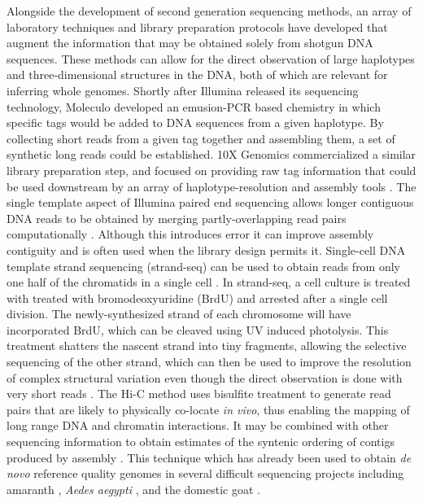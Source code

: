 Alongside the development of second generation sequencing methods, an array of laboratory techniques and library preparation protocols have developed that augment the information that may be obtained solely from shotgun DNA sequences.
These methods can allow for the direct observation of large haplotypes and three-dimensional structures in the DNA, both of which are relevant for inferring whole genomes.
Shortly after Illumina released its sequencing technology, Moleculo developed an emusion-PCR based chemistry in which specific tags would be added to DNA sequences from a given haplotype.
By collecting short reads from a given tag together and assembling them, a set of synthetic long reads could be established.
10X Genomics commercialized a similar library preparation step, and focused on providing raw tag information that could be used downstream by an array of haplotype-resolution and assembly tools \cite{mostovoy2016hybrid}.
The single template aspect of Illumina paired end sequencing allows longer contiguous DNA reads to be obtained by merging partly-overlapping read pairs computationally \cite{magovc2011flash}.
Although this introduces error it can improve assembly contiguity and is often used when the library design permits it.
Single-cell DNA template strand sequencing (strand-seq) can be used to obtain reads from only one half of the chromatids in a single cell \cite{falconer2012dna}.
In strand-seq, a cell culture is treated with treated with bromodeoxyuridine (BrdU) and arrested after a single cell division.
The newly-synthesized strand of each chromosome will have incorporated BrdU, which can be cleaved using UV induced photolysis.
This treatment shatters the nascent strand into tiny fragments, allowing the selective sequencing of the other strand, which can then be used to improve the resolution of complex structural variation even though the direct observation is done with very short reads \cite{porubsky2016direct}.
The Hi-C method \cite{lieberman2009comprehensive} uses bisulfite treatment to generate read pairs that are likely to physically co-locate \emph{in vivo}, thus enabling the mapping of long range DNA and chromatin interactions.
It may be combined with other sequencing information to obtain estimates of the syntenic ordering of contigs produced by assembly \cite{ghurye2018integrating}.
This technique which has already been used to obtain \emph{de novo} reference quality genomes in several difficult sequencing projects including amaranth \cite{lightfoot2017single}, \emph{Aedes aegypti} \cite{dudchenko2017novo}, and the domestic goat \cite{bickhart2017single}.

